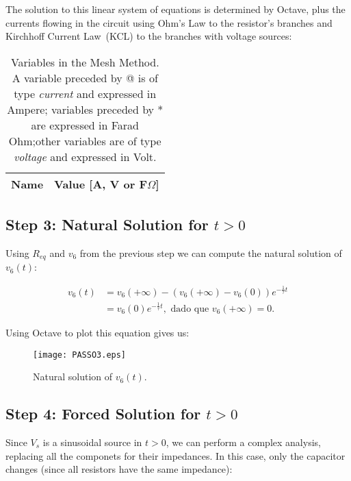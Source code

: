 The solution to this linear system of equations is determined by Octave, plus the currents flowing in the circuit using Ohm's Law to the resistor's branches and Kirchhoff Current Law~(KCL) to the branches with voltage sources:

\begin{table}[h]
  \centering
  \begin{tabular}{|l|r|}
    \hline    
    {\bf Name} & {\bf Value [A, V or F$\Omega$]} \\ \hline
    
  \end{tabular}
  \caption{Variables in the Mesh Method. A variable preceded by @ is of type {\em current} and expressed in Ampere; variables preceded by * are expressed in Farad Ohm;other variables are of type {\em voltage} and expressed in Volt.}
  \label{tab:TEO_PASSO2}
\end{table}


\subsection{Step 3: Natural Solution for $t>0$}

Using $R_{eq}$ and $v_6$ from the previous step we can compute the natural solution of $v_6(t)$:

\begin{equation}
	\begin{split}
	v_6(t) 	&= v_6(+\infty) - (v_6(+\infty) - v_6(0))e^{-\frac{1}{\tau}t}		\\				
			&= v_6(0)e^{-\frac{1}{\tau}t}, \text{ dado que } v_6(+\infty) = 0.
	\end{split}
\end{equation}

Using Octave to plot this equation gives us:

\begin{figure}[h] \centering
\texttt{[image: PASSO3.eps]}
\caption{Natural solution of $v_6(t)$.}
\label{fig:TEO_NAT_SOL}
\end{figure}

\subsection{Step 4: Forced Solution for $t>0$}

Since $V_s$ is a sinusoidal source in $t>0$, we can perform a complex analysis, replacing all the componets for their impedances. In this case, only the capacitor changes (since all resistors have the same impedance):

